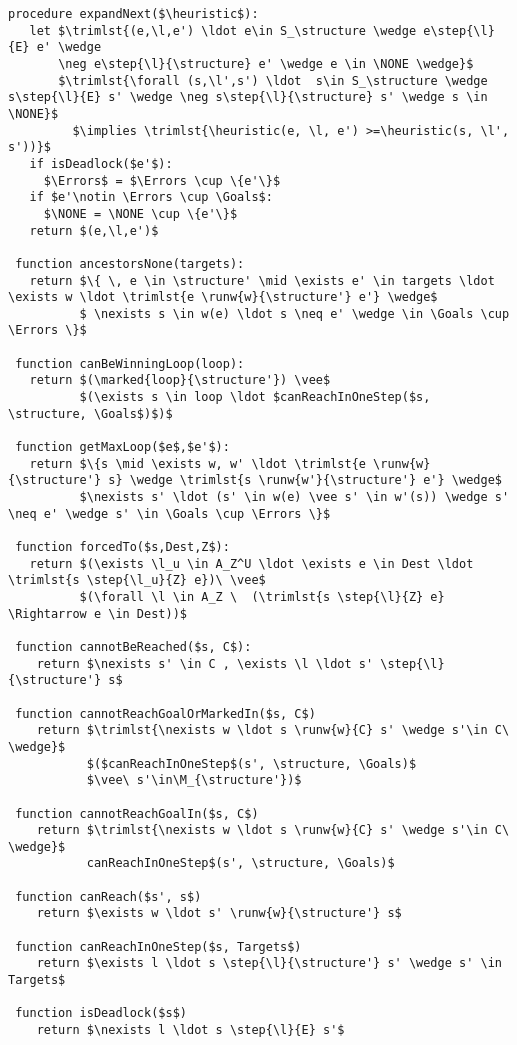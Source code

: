\begin{lstlisting}[language={pseudocode},label={lst:dcs.aux},caption={auxiliary procedures.},float=ht, frame=single]
 procedure expandNext($\heuristic$):
   let $\trimlst{(e,\l,e') \ldot e\in S_\structure \wedge e\step{\l}{E} e' \wedge   
       \neg e\step{\l}{\structure} e' \wedge e \in \NONE \wedge}$ 
       $\trimlst{\forall (s,\l',s') \ldot  s\in S_\structure \wedge s\step{\l}{E} s' \wedge \neg s\step{\l}{\structure} s' \wedge s \in \NONE}$ 
         $\implies \trimlst{\heuristic(e, \l, e') >=\heuristic(s, \l',   s'))}$
   if isDeadlock($e'$):
     $\Errors$ = $\Errors \cup \{e'\}$
   if $e'\notin \Errors \cup \Goals$:
     $\NONE = \NONE \cup \{e'\}$
   return $(e,\l,e')$
 
 function ancestorsNone(targets):
   return $\{ \, e \in \structure' \mid \exists e' \in targets \ldot \exists w \ldot \trimlst{e \runw{w}{\structure'} e'} \wedge$
          $ \nexists s \in w(e) \ldot s \neq e' \wedge \in \Goals \cup \Errors \}$
   
 function canBeWinningLoop(loop):
   return $(\marked{loop}{\structure'}) \vee$ 
          $(\exists s \in loop \ldot $canReachInOneStep($s, \structure, \Goals$)$)$
   
 function getMaxLoop($e$,$e'$):
   return $\{s \mid \exists w, w' \ldot \trimlst{e \runw{w}{\structure'} s} \wedge \trimlst{s \runw{w'}{\structure'} e'} \wedge$ 
          $\nexists s' \ldot (s' \in w(e) \vee s' \in w'(s)) \wedge s' \neq e' \wedge s' \in \Goals \cup \Errors \}$

 function forcedTo($s,Dest,Z$):
   return $(\exists \l_u \in A_Z^U \ldot \exists e \in Dest \ldot \trimlst{s \step{\l_u}{Z} e})\ \vee$
          $(\forall \l \in A_Z \  (\trimlst{s \step{\l}{Z} e} \Rightarrow e \in Dest))$    
    
 function cannotBeReached($s, C$):
    return $\nexists s' \in C , \exists \l \ldot s' \step{\l}{\structure'} s$
   
 function cannotReachGoalOrMarkedIn($s, C$)
    return $\trimlst{\nexists w \ldot s \runw{w}{C} s' \wedge s'\in C\ \wedge}$ 
           $($canReachInOneStep$(s', \structure, \Goals)$
           $\vee\ s'\in\M_{\structure'})$
           
 function cannotReachGoalIn($s, C$)
    return $\trimlst{\nexists w \ldot s \runw{w}{C} s' \wedge s'\in C\ \wedge}$ 
           canReachInOneStep$(s', \structure, \Goals)$
           
 function canReach($s', s$)
    return $\exists w \ldot s' \runw{w}{\structure'} s$

 function canReachInOneStep($s, Targets$)
    return $\exists l \ldot s \step{\l}{\structure'} s' \wedge s' \in Targets$

 function isDeadlock($s$)
    return $\nexists l \ldot s \step{\l}{E} s'$
\end{lstlisting}

